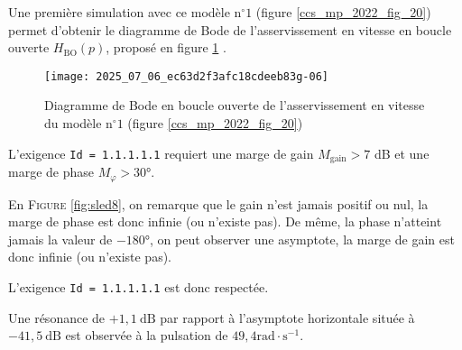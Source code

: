 \ifprof
\else
Une première simulation avec ce modèle $\mathrm{n}^{\circ} 1$ (figure \ref{ccs_mp_2022_fig_20}) permet d'obtenir le diagramme de Bode de l'asservissement en vitesse en boucle ouverte $H_{\mathrm{BO}}(p)$, proposé en figure \ref{ccs_mp_2022_fig_08} .

\begin{figure}[!h]
\centering
\texttt{[image: 2025\_07\_06\_ec63d2f3afc18cdeeb83g-06]}
\caption{\label{ccs_mp_2022_fig_08}Diagramme de Bode en boucle ouverte de l'asservissement en vitesse du modèle $\mathrm{n}^{\circ} 1$ (figure \ref{ccs_mp_2022_fig_20})}
\end{figure}
\fi


\ifprof
\begin{corrige}
L'exigence \texttt{Id = 1.1.1.1.1} requiert une marge de gain $M_\text{gain} > 7$ dB et une marge de phase $M_\varphi > 30$°.

En \textsc{Figure} \ref{fig:sled8}, on remarque que le gain n'est jamais positif ou nul, la marge de phase est donc infinie (ou n'existe pas). De même, la phase n'atteint jamais la valeur de $-180$°, on peut observer une asymptote, la marge de gain est donc infinie (ou n'existe pas).

L'exigence \texttt{Id = 1.1.1.1.1} est donc respectée. 
\end{corrige}
\else
\fi


Une résonance de $+1,1 \mathrm{~dB}$ par rapport à l'asymptote horizontale située à $-41,5 \mathrm{~dB}$ est observée à la pulsation de $49,4 \mathrm{rad} \cdot \mathrm{s}^{-1}$.

